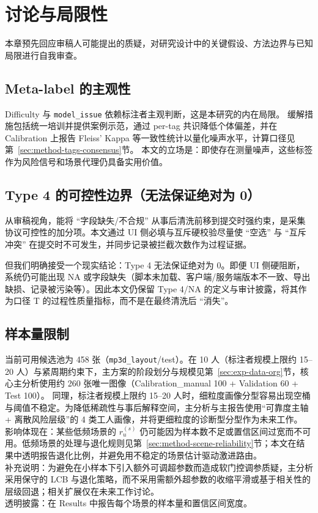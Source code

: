 ﻿\section{讨论与局限性}

本章预先回应审稿人可能提出的质疑，对研究设计中的关键假设、方法边界与已知局限进行自我审查。
\subsection{Meta-label 的主观性}

Difficulty 与 \texttt{model\_issue} 依赖标注者主观判断，这是本研究的内在局限。
缓解措施包括统一培训并提供案例示范，通过 per-tag 共识降低个体偏差，并在 Calibration 上报告 Fleiss' Kappa 等一致性统计以量化噪声水平，计算口径见第~\ref{sec:method-tags-consensus}节。
本文的立场是：即使存在测量噪声，这些标签作为风险信号和场景代理仍具备实用价值。

\subsection{Type 4 的可控性边界（无法保证绝对为 0）}

从审稿视角，能将 ``字段缺失/不合规'' 从事后清洗前移到提交时强约束，是采集协议可控性的加分项。本文通过 UI 侧必填与互斥硬校验尽量使 ``空选'' 与 ``互斥冲突'' 在提交时不可发生，并同步记录被拦截次数作为过程证据。

但我们明确接受一个现实结论：Type 4 无法保证绝对为 0。即便 UI 侧硬阻断，系统仍可能出现 NA 或字段缺失（脚本未加载、客户端/服务端版本不一致、导出缺损、记录被污染等）。因此本文仍保留 Type 4/NA 的定义与审计披露，将其作为口径 T 的过程性质量指标，而不是在最终清洗后 ``消失''。
\subsection{样本量限制}
当前可用候选池为 458 张（\texttt{mp3d\_layout}/test）。在 10 人（标注者规模上限约 15--20 人）与紧周期约束下，主方案的阶段划分与规模见第~\ref{sec:exp-data-org}节，核心主分析使用约 260 张唯一图像（Calibration\_manual 100 + Validation 60 + Test 100）。
同理，标注者规模上限约 15--20 人时，细粒度画像分型容易出现空桶与阈值不稳定。为降低稀疏性与事后解释空间，主分析与主报告使用“可靠度主轴 + 离散风险层级”的 4 类工人画像，并将更细粒度的诊断型分型作为未来工作。
\\ 影响体现在：某些低频场景的 $r_{u}^{(s)}$ 仍可能因为样本数不足或置信区间过宽而不可用。低频场景的处理与退化规则见第~\ref{sec:method-scene-reliability}节；本文在结果中透明报告退化比例，并避免用不稳定的场景估计驱动激进路由。
\\ 补充说明：为避免在小样本下引入额外可调超参数而造成软门控调参质疑，主分析采用保守的 LCB 与退化策略，而不采用需额外超参数的收缩平滑或基于相关性的层级回退；相关扩展仅在未来工作讨论。
\\ 透明披露：在 Results 中报告每个场景的样本量和置信区间宽度。

